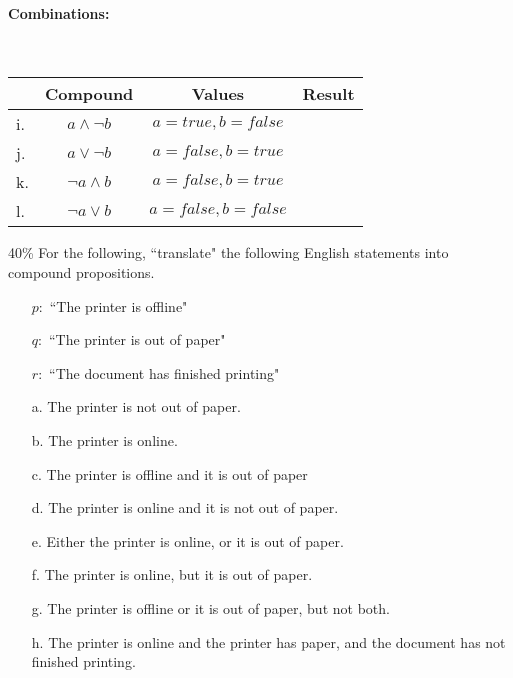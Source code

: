 \documentclass[a4paper,12pt]{book}
\begin{document}
        \paragraph{Combinations:} ~\\

        \begin{tabular}{ | l  c | c | p{6cm} | }
            \hline
            & \textbf{Compound} & \textbf{Values} & \textbf{Result}
            \\ \hline

            i. &        $a \land \neg b$ &       $a = true, b = false$ &   \\ \hline
            j. &        $a \lor \neg b$ &        $a = false, b = true$ &   \\ \hline

            k. &        $\neg a \land b$ &       $a = false, b = true$ &   \\ \hline
            l. &        $\neg a \lor b$ &        $a = false, b = false$ &  \\ \hline
        \end{tabular}


        \newpage
        \begin{question}{3}{40\%}
            For the following, ``translate" the following English statements
            into compound propositions.

            \begin{itemize}
                \item[] $p:$ ``The printer is offline"
                \item[] $q:$ ``The printer is out of paper"
                \item[] $r:$ ``The document has finished printing"
            \end{itemize}
        \end{question}

        \begin{enumerate}
            \item[a.] The printer is not out of paper.
            \item[b.] The printer is online.
            \item[c.] The printer is offline and it is out of paper
            \item[d.] The printer is online and it is not out of paper.
            \item[e.] Either the printer is online, or it is out of paper.
            \item[f.] The printer is online, but it is out of paper.
            \item[g.] The printer is offline or it is out of paper, but not both.
            \item[h.] The printer is online and the printer has paper, and the document has not finished printing.
        \end{enumerate}
\end{document}
